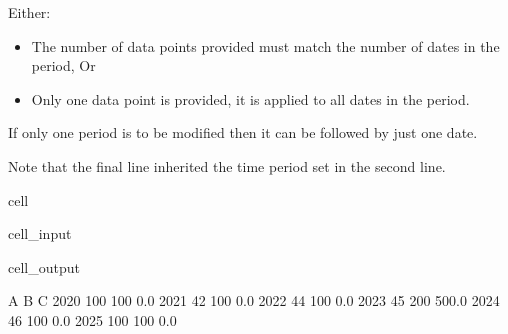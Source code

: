 \documentclass[letterpaper,10pt,english]{jupyterBook}
\begin{document}
\sphinxAtStartPar
Either:
\begin{itemize}
\item {} 
\sphinxAtStartPar
The number of data points provided must match the number of dates in the period, Or

\item {} 
\sphinxAtStartPar
Only one data point is provided, it is applied to all dates in the period.

\end{itemize}

\sphinxAtStartPar
If only one period is to be modified then it can be followed by just one date.

\sphinxAtStartPar
Note that the final line inherited the time period set in the second line.

\begin{sphinxuseclass}{cell}\begin{sphinxVerbatimInput}

\begin{sphinxuseclass}{cell_input}
\begin{sphinxVerbatim}[commandchars=\\\{\}]
\end{sphinxVerbatim}

\end{sphinxuseclass}\end{sphinxVerbatimInput}
\begin{sphinxVerbatimOutput}

\begin{sphinxuseclass}{cell_output}
\begin{sphinxVerbatim}[commandchars=\\\{\}]
        A    B      C
2020  100  100    0.0
2021   42  100    0.0
2022   44  100    0.0
2023   45  200  500.0
2024   46  100    0.0
2025  100  100    0.0
\end{sphinxVerbatim}

\end{sphinxuseclass}\end{sphinxVerbatimOutput}

\end{sphinxuseclass}
\end{document}
